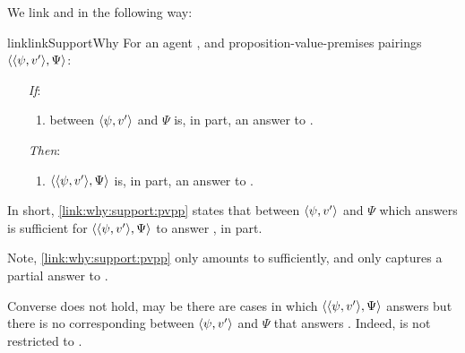 \begin{note}
  We link \qWhyVnP{} and \qWhy{} in the following way:

  \begin{restatable}{link}{linkSupportWhy}
    \label{link:why:support:pvpp}
    For an agent \vAgent{}, and proposition-value-premises pairings \(\langle \langle \psi, v' \rangle, \Psi \rangle\):

    \begin{itemize}
    \item[\emph{If}:]
      \begin{enumerate}[label=\alph*., ref=(\alph*)]
      \item
         between \(\langle \psi, v' \rangle\) and \(\Psi\) is, in part, an answer to \qWhyVnP{}.
      \end{enumerate}
    \item[\emph{Then}:]
      \begin{enumerate}[label=\alph*., ref=(\alph*), resume]
      \item
        \(\langle \langle \psi, v' \rangle, \Psi \rangle\) is, in part, an answer to \qWhy{}.
      \end{enumerate}
    \end{itemize}
    \vspace{-\baselineskip}
  \end{restatable}

  In short, \autoref{link:why:support:pvpp} states that \support{} between \(\langle \psi, v' \rangle\) and \(\Psi\) which answers \qWhyVnP{} is sufficient for \(\langle \langle \psi, v' \rangle, \Psi \rangle\) to answer \qWhy{}, in part.

  Note, \autoref{link:why:support:pvpp} only amounts to sufficiently, and only captures a partial answer to \qWhy{}.

  Converse does not hold, may be there are cases in which \(\langle \langle \psi, v' \rangle, \Psi \rangle\) answers \qWhy{} but there is no corresponding \ros{} between \(\langle \psi, v' \rangle\) and \(\Psi\) that answers \qWhyVnP{}.
  Indeed, \qWhy{} is not restricted to .
\end{note}

\subsection{\qHowV{}}
\label{sec:variants-initial:qhowv}

